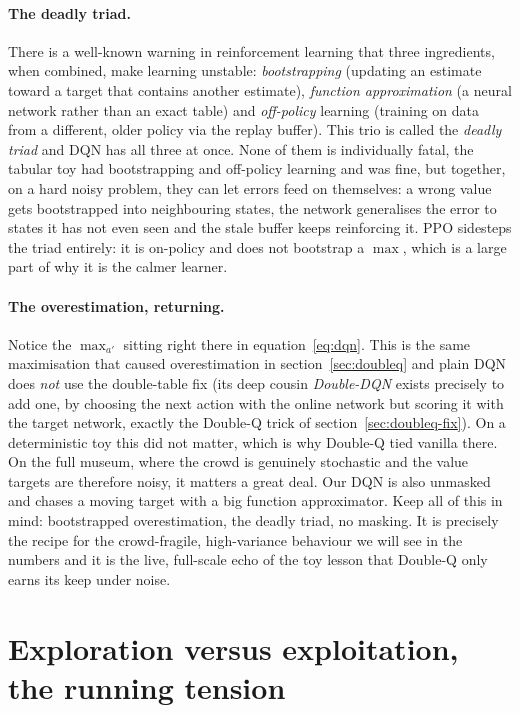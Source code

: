 \documentclass[11pt]{article}
\newcommand{\key}[1]{\textit{#1}}            %
\begin{document}
\paragraph{The deadly triad.} There is a well-known warning in reinforcement learning that
three ingredients, when combined, make learning unstable: \key{bootstrapping} (updating an
estimate toward a target that contains another estimate), \key{function approximation} (a
neural network rather than an exact table) and \key{off-policy} learning (training on data
from a different, older policy via the replay buffer). This trio is called the \key{deadly
triad} and DQN has all three at once. None of them is individually fatal, the tabular toy
had bootstrapping and off-policy learning and was fine, but together, on a hard noisy
problem, they can let errors feed on themselves: a wrong value gets bootstrapped into
neighbouring states, the network generalises the error to states it has not even seen and
the stale buffer keeps reinforcing it. PPO sidesteps the triad entirely: it is on-policy and
does not bootstrap a $\max$, which is a large part of why it is the calmer learner.

\paragraph{The overestimation, returning.} Notice the $\max_{a'}$ sitting right there in
equation~\eqref{eq:dqn}. This is the same maximisation that caused overestimation in
section~\ref{sec:doubleq} and plain DQN does \emph{not} use the double-table fix (its deep cousin
\key{Double-DQN} exists precisely to add one, by choosing the next action with the online
network but scoring it with the target network, exactly the Double-Q trick of section~\ref{sec:doubleq-fix}).
On a deterministic toy this did not matter, which is why Double-Q tied vanilla there. On the
full museum, where the crowd is genuinely stochastic and the value targets are therefore
noisy, it matters a great deal. Our DQN is also unmasked and chases a moving target with a
big function approximator. Keep all of this in mind: bootstrapped overestimation, the deadly
triad, no masking. It is precisely the recipe for the crowd-fragile, high-variance behaviour
we will see in the numbers and it is the live, full-scale echo of the toy lesson that
Double-Q only earns its keep under noise.

\section{Exploration versus exploitation, the running tension}
\end{document}
